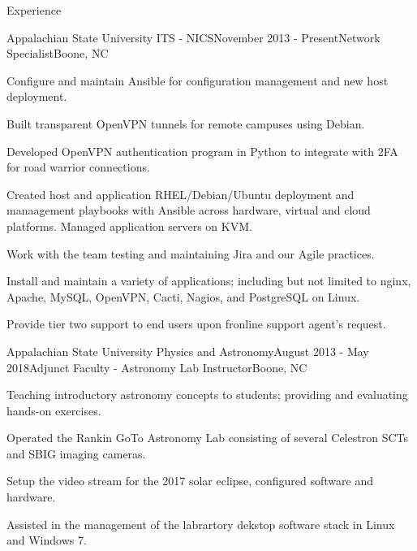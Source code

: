 \documentclass{cv} %
\begin{document}

\begin{rSection}{Experience}

\begin{rSubsection}{Appalachian State University ITS - NICS}{November 2013 - Present}{Network Specialist}{Boone, NC}
\item Configure and maintain Ansible for configuration management and new host deployment.
\item Built transparent OpenVPN tunnels for remote campuses using Debian.
\item Developed OpenVPN authentication program in Python to integrate with 2FA for road warrior connections.
\item Created host and application RHEL/Debian/Ubuntu deployment and manaagement playbooks with Ansible across hardware, virtual and cloud platforms. Managed application servers on KVM.
\item Work with the team testing and maintaining Jira and our Agile practices.
\item Install and maintain a variety of applications; including but not limited to nginx, Apache, MySQL, OpenVPN, Cacti, Nagios, and PostgreSQL on Linux.
\item Provide tier two support to end users upon fronline support agent's request.

\end{rSubsection}

\begin{rSubsection}{Appalachian State University Physics and Astronomy}{August 2013 - May 2018}{Adjunct Faculty - Astronomy Lab Instructor}{Boone, NC}
\item Teaching introductory astronomy concepts to students; providing and evaluating hands-on exercises.
\item Operated the Rankin GoTo Astronomy Lab consisting of several Celestron SCTs and SBIG imaging cameras.
\item Setup the video stream for the 2017 solar eclipse, configured software and hardware.
\item Assisted in the management of the labrartory dekstop software stack in Linux and Windows 7.
\end{rSubsection}


\end{rSection}
\end{document}
